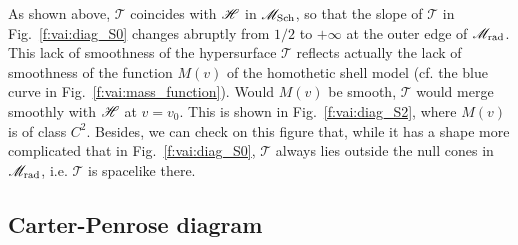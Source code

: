 \begin{remark}
As shown above, $\mathscr{T}$ coincides with $\mathscr{H}$ in $\mathscr{M}_{\rm Sch}$, so that
the slope of $\mathscr{T}$ in Fig.~\ref{f:vai:diag_S0} changes abruptly from $1/2$
to $+\infty$ at the outer edge of $\mathscr{M}_{\rm rad}$.
This lack of smoothness of the hypersurface $\mathscr{T}$ reflects actually
the lack of smoothness of the function $M(v)$ of the homothetic shell model
(cf. the blue curve in Fig.~\ref{f:vai:mass_function}). Would $M(v)$ be smooth,
$\mathscr{T}$ would merge smoothly with $\mathscr{H}$ at $v=v_0$. This is shown in
Fig.~\ref{f:vai:diag_S2}, where $M(v)$ is of class $C^2$. Besides, we can check
on this figure that, while it has a shape more complicated
that in Fig.~\ref{f:vai:diag_S0}, $\mathscr{T}$ always lies outside the null cones in
$\mathscr{M}_{\rm rad}$, i.e. $\mathscr{T}$ is spacelike there.
\end{remark}

\subsection{Carter-Penrose diagram} \label{f:vai:thin_CP}

